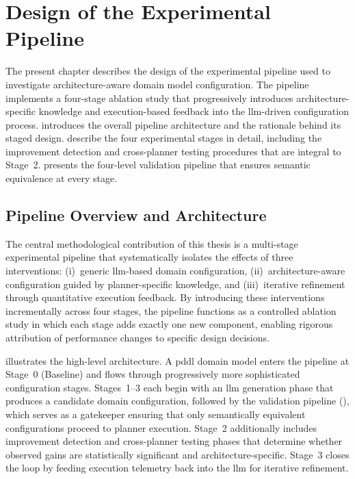 
\chapter{Design of the Experimental Pipeline}\label{ch:design}

The present chapter describes the design of the experimental pipeline used to investigate architecture-aware domain model configuration.
The pipeline implements a four-stage ablation study that progressively introduces architecture-specific knowledge and execution-based feedback into the \gls{llm}-driven configuration process.
 introduces the overall pipeline architecture and the rationale behind its staged design.
 describe the four experimental stages in detail, including the improvement detection and cross-planner testing procedures that are integral to Stage~2.
 presents the four-level validation pipeline that ensures semantic equivalence at every stage.

\section{Pipeline Overview and Architecture}
\label{sec:design:overview}

The central methodological contribution of this thesis is a multi-stage experimental pipeline that systematically isolates the effects of three interventions: (i)~generic \gls{llm}-based domain configuration, (ii)~architecture-aware configuration guided by planner-specific knowledge, and (iii)~iterative refinement through quantitative execution feedback.
By introducing these interventions incrementally across four stages, the pipeline functions as a controlled ablation study in which each stage adds exactly one new component, enabling rigorous attribution of performance changes to specific design decisions.

 illustrates the high-level architecture.
A \gls{pddl} domain model enters the pipeline at Stage~0 (Baseline) and flows through progressively more sophisticated configuration stages.
Stages~1--3 each begin with an \gls{llm} generation phase that produces a candidate domain configuration, followed by the validation pipeline (), which serves as a gatekeeper ensuring that only semantically equivalent configurations proceed to planner execution.
Stage~2 additionally includes improvement detection and cross-planner testing phases that determine whether observed gains are statistically significant and architecture-specific.
Stage~3 closes the loop by feeding execution telemetry back into the \gls{llm} for iterative refinement.

